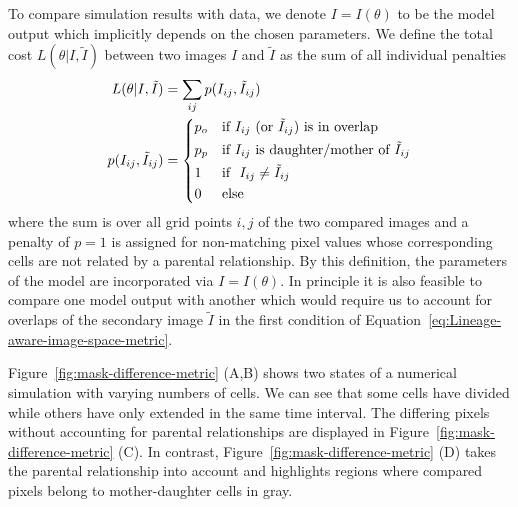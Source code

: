 To compare simulation results with data, we denote $I=I(\theta)$ to be the model output which
implicitly depends on the chosen parameters.
We define the total cost $L(\theta|I,\tilde{I})$ between two images $I$ and $\tilde{I}$ as the sum
of all individual penalties
\begin{align}
    L(\theta|I,\tilde{I}) &= \sum\limits_{ij} p(I_{ij}, \tilde{I}_{ij})\\
    p(I_{ij},\tilde{I}_{ij}) &= \begin{cases*}
        p_o & \text{if $I_{ij}$ (or $\tilde{I}_{ij}$) is in overlap}\\
        p_p & \text{if $I_{ij}$ is daughter/mother of $\tilde{I}_{ij}$}\\
        1 & \text{if } $I_{ij}\neq \tilde{I}_{ij}$\\
        0 & \text{else}
    \end{cases*}
    \label{eq:Lineage-aware-image-space-metric}
\end{align}
where the sum is over all grid points $i,j$ of the two compared images and a penalty of $p=1$ is
assigned for non-matching pixel values whose corresponding cells are not related by a parental
relationship.
By this definition, the parameters of the model are incorporated via $I=I(\theta)$.
In principle it is also feasible to compare one model output with another which would require us to
account for overlaps of the secondary image $\tilde{I}$ in the first condition of
Equation~\ref{eq:Lineage-aware-image-space-metric}.

Figure~\ref{fig:mask-difference-metric} (A,B) shows two states of a numerical simulation
with varying numbers of cells.
We can see that some cells have divided while others have only extended in the same time interval.
The differing pixels without accounting for parental relationships are displayed in
Figure~\ref{fig:mask-difference-metric} (C).
In contrast, Figure~\ref{fig:mask-difference-metric} (D) takes the parental relationship into
account and highlights regions where compared pixels belong to mother-daughter cells in gray.


